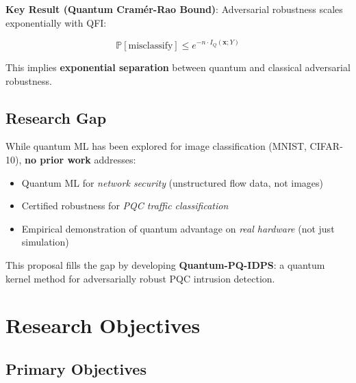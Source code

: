 \documentclass[11pt]{article}
\begin{document}
\textbf{Key Result (Quantum Cramér-Rao Bound)}: Adversarial robustness scales exponentially with QFI:

\begin{equation}
\mathbb{P}[\text{misclassify}] \leq e^{-n \cdot I_Q(\mathbf{x}; Y)}
\end{equation}

This implies \textbf{exponential separation} between quantum and classical adversarial robustness.

\subsection{Research Gap}

While quantum ML has been explored for image classification (MNIST, CIFAR-10), \textbf{no prior work} addresses:
\begin{itemize}
    \item Quantum ML for \textit{network security} (unstructured flow data, not images)
    \item Certified robustness for \textit{PQC traffic classification}
    \item Empirical demonstration of quantum advantage on \textit{real hardware} (not just simulation)
\end{itemize}

This proposal fills the gap by developing \textbf{Quantum-PQ-IDPS}: a quantum kernel method for adversarially robust PQC intrusion detection.

\section{Research Objectives}

\subsection{Primary Objectives}
\end{document}
